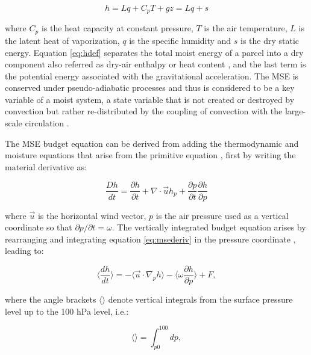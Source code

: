 \begin{equation}
h=Lq+C_pT+gz=Lq+s
\label{eq:hdef}
\end{equation}

\noindent where $C_p$ is the heat capacity at constant pressure, $T$ is the air temperature, $L$ is the latent heat of vaporization, $q$ is the specific humidity and $s$ is the dry static energy. 
Equation \ref{eq:hdef} separates the total moist energy of a parcel into a dry component also referred as dry-air enthalpy or heat content \citep{emanuel2007quasi}, and the last term is the potential energy associated with the gravitational acceleration. 
The MSE is conserved under pseudo-adiabatic processes and thus is considered to be a key variable of a moist system, a state variable that is not created or destroyed by convection but rather re-distributed by the coupling of convection with the large-scale circulation \citep{chou2004,emanuel2007quasi}.

The MSE budget equation can be derived from adding the thermodynamic and moisture equations that arise from the primitive equation \citep{neelin2005}, first by writing the material derivative as:

\begin{equation}
\frac{Dh}{dt}=\frac{\partial h}{\partial t}+\nabla\cdot{\vec{u}h}_p+\frac{\partial p}{\partial t}\frac{\partial h}{\partial p}
\label{eq:msederiv}
\end{equation}

\noindent where $\vec{u}$ is the horizontal wind vector, $p$ is the air pressure used as a vertical coordinate so that $\partial p/\partial t = \omega$. 
The vertically integrated budget equation arises by rearranging and integrating equation \ref{eq:msederiv} in the pressure coordinate \citep{back2006,inoue2015,annamalai2020}, leading to:

\begin{equation}
\Bigg\langle \frac{d h}{dt} \Bigg\rangle=-\Bigg\langle \vec{u}\cdot\nabla _p h  \Bigg\rangle -\Bigg\langle \omega\frac{\partial h}{\partial p}\Bigg\rangle + F,
\label{eq:msebudget}
\end{equation}

\noindent where the angle brackets $\langle \rangle$ denote vertical integrals from the surface pressure level up to the 100 hPa level, i.e.:

\begin{equation}
\Bigg\langle \Bigg\rangle= \int_{p0}^{100} dp, 
\end{equation}

